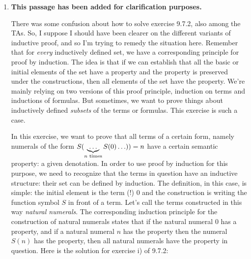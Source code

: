 \begin{enumerate}[\thesection.1]
\begin{proof}
\begin{itemize}
	\end{itemize}
This concludes our induction.				
		
	\end{proof}
	The Locality Lemma essentially states that the value of a term under an assignment only depends on the values the assignment gives to the variables in the term. In fact, we can infer the following corollary about \emph{ground terms}, i.e. terms without variables in them
		\begin{corollary}
		Let $\mathcal{M}$ be a model and $t\in\mathcal{T}$ a ground term. Then for all assignments $\alpha,\beta$, we have $\llbracket t\rrbracket_\alpha^\mathcal{M}=\llbracket t\rrbracket_\beta^\mathcal{M}$.
		\end{corollary}
		\begin{proof}
		Exercise 9.7.3.
		\end{proof}
	
              \item \textbf{This passage has been added for clarification purposes.}

		There was some confusion about how to solve exercise 9.7.2, also among the TAs.
		So, I suppose I should have been clearer on the different variants of inductive proof, and so I'm trying to remedy the situation here.
		Remember that for \emph{every} inductively defined set, we have a corresponding principle for proof by induction.
		The idea is that if we can establish that all the basic or initial elements of the set have a property and the property is preserved under the constructions, then all elements of the set have the property.
		We're mainly relying on two versions of this proof principle, induction on terms and inductions of formulas.
		But sometimes, we want to prove things about inductively defined \emph{subsets} of the terms or formulas.
		This exercise is such a case.

		In this exercise, we want to prove that all terms of a certain form, namely numerals of the form
		$S(\underbrace{\mathellipsis}_{n\text{ times}}S(0)\mathellipsis))=n$
		have a certain semantic property: a given denotation.
		In order to use proof by induction for this purpose, we need to recognize that the terms in question have an inductive structure: their set can be defined by induction.
		The definition, in this case, is simple: the initial element is the term (!) 0 and the construction is writing the function symbol $S$ in front of a term.
		Let's call the terms constructed in this way \emph{natural numerals}.
		The corresponding induction principle for the construction of natural numerals states that if the natural numeral 0 has a property, and if a natural numeral $n$ has the property then the numeral $S(n)$ has the property, then all natural numerals have the property in question.
		Here is the solution for exercise i) of 9.7.2:


\end{enumerate}
